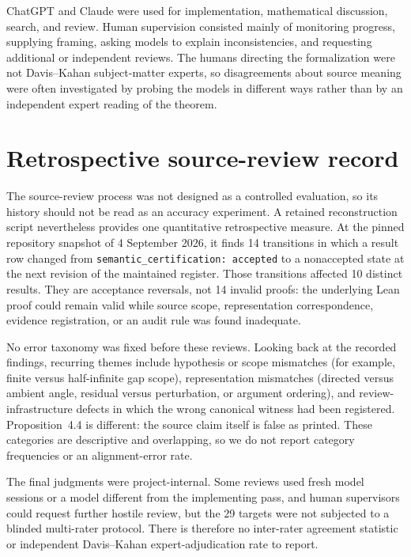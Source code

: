 ChatGPT and Claude were used for implementation, mathematical discussion,
search, and review.  Human supervision consisted mainly of monitoring progress,
supplying framing, asking models to explain inconsistencies, and requesting
additional or independent reviews.  The humans directing the formalization were
not Davis--Kahan subject-matter experts, so disagreements about source meaning
were often investigated by probing the models in different ways rather than by
an independent expert reading of the theorem.

\section{Retrospective source-review record}
\label{app:review-record}

The source-review process was not designed as a controlled evaluation, so its
history should not be read as an accuracy experiment.  A retained reconstruction
script nevertheless provides one quantitative retrospective measure.  At the
pinned repository snapshot of 4 September 2026, it finds 14 transitions in
which a result row changed from \texttt{semantic\_certification: accepted} to a
nonaccepted state at the next revision of the maintained register.  Those
transitions affected 10 distinct results.  They are acceptance reversals, not
14 invalid proofs: the underlying Lean proof could remain valid while source
scope, representation correspondence, evidence registration, or an audit rule
was found inadequate.

No error taxonomy was fixed before these reviews.  Looking back at the recorded
findings, recurring themes include hypothesis or scope mismatches (for example,
finite versus half-infinite gap scope), representation mismatches (directed
versus ambient angle, residual versus perturbation, or argument ordering), and
review-infrastructure defects in which the wrong canonical witness had been
registered.  Proposition~4.4 is different: the source claim itself is false as
printed.  These categories are descriptive and overlapping, so we do not report
category frequencies or an alignment-error rate.

The final judgments were project-internal.  Some reviews used fresh model
sessions or a model different from the implementing pass, and human supervisors
could request further hostile review, but the 29 targets were not subjected to
a blinded multi-rater protocol.  There is therefore no inter-rater agreement
statistic or independent Davis--Kahan expert-adjudication rate to report.

